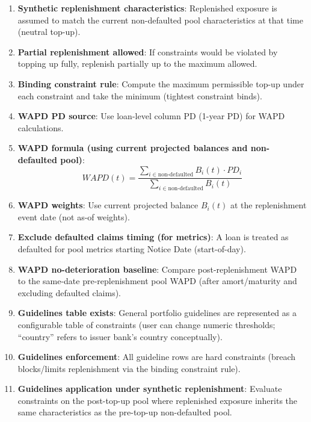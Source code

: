 \documentclass[11pt]{article}
\begin{document}
\begin{enumerate}[label=\arabic*),leftmargin=*,align=left]
\item \textbf{Synthetic replenishment characteristics}: Replenished exposure is assumed to match the current non-defaulted pool characteristics at that time (neutral top-up).

\item \textbf{Partial replenishment allowed}: If constraints would be violated by topping up fully, replenish partially up to the maximum allowed.

\item \textbf{Binding constraint rule}: Compute the maximum permissible top-up under each constraint and take the minimum (tightest constraint binds).

\item \textbf{WAPD PD source}: Use loan-level column PD (1-year PD) for WAPD calculations.

\item \textbf{WAPD formula (using current projected balances and non-defaulted pool)}: 
\[ WAPD(t) = \frac{\sum_{i \in \text{non-defaulted}} B_i(t) \cdot PD_i}{\sum_{i \in \text{non-defaulted}} B_i(t)} \]

\item \textbf{WAPD weights}: Use current projected balance $B_i(t)$ at the replenishment event date (not as-of weights).

\item \textbf{Exclude defaulted claims timing (for metrics)}: A loan is treated as defaulted for pool metrics starting Notice Date (start-of-day).

\item \textbf{WAPD no-deterioration baseline}: Compare post-replenishment WAPD to the same-date pre-replenishment pool WAPD (after amort/maturity and excluding defaulted claims).

\item \textbf{Guidelines table exists}: General portfolio guidelines are represented as a configurable table of constraints (user can change numeric thresholds; “country” refers to issuer bank’s country conceptually).

\item \textbf{Guidelines enforcement}: All guideline rows are hard constraints (breach blocks/limits replenishment via the binding constraint rule).

\item \textbf{Guidelines application under synthetic replenishment}: Evaluate constraints on the post-top-up pool where replenished exposure inherits the same characteristics as the pre-top-up non-defaulted pool.


\end{enumerate}
\end{document}
